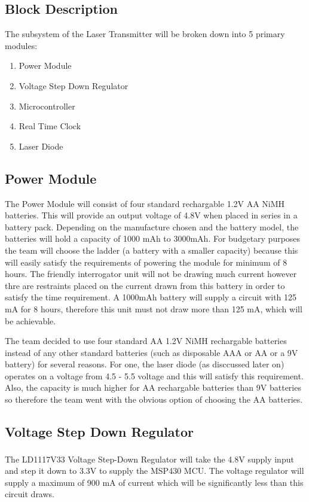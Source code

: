 \documentclass[letterpaper,10pt]{article}
\begin{document}
\begin{spacing}{1.15}
\section{Block Description}
The subsystem of the Laser Transmitter will be broken down into 5 primary modules:
\begin{enumerate}
	\item Power Module
	\item Voltage Step Down Regulator
	\item Microcontroller 
	\item Real Time Clock
	\item Laser Diode
\end{enumerate}

\subsection*{Power Module}
The Power Module will consist of four standard rechargable 1.2V AA NiMH batteries. This will provide an output voltage of 4.8V when placed in series in a battery pack. Depending on the manufacture chosen and the battery model, the batteries will hold a capacity of 1000 mAh to 3000mAh. For budgetary purposes the team will choose the ladder (a battery with a smaller capacity) because this will easily satisfy the requirements of powering the module for minimum of 8 hours. The friendly interrogator unit will not be drawing much current however thre are restraints placed on the current drawn from this battery in order to satisfy the time requirement. A 1000mAh battery will supply a circuit with 125 mA for 8 hours, therefore this unit must not draw more than 125 mA, which will be achievable.

The team decided to use four standard AA 1.2V NiMH rechargable batteries instead of any other standard batteries (such as disposable AAA or AA or a 9V battery) for several reasons. For one, the laser diode (as disccussed later on) operates on a voltage from 4.5 - 5.5 voltage and this will satisfy this requirement. Also, the capacity is much higher for AA rechargable batteries than 9V batteries so therefore the team went with the obvious option of choosing the AA batteries.  

\subsection*{Voltage Step Down Regulator}
The LD1117V33 Voltage Step-Down Regulator\textsuperscript{\cite{LD1117-Voltage-Regulator}} will take the 4.8V supply input and step it down to 3.3V to supply the MSP430 MCU. The voltage regulator will supply a maximum of 900 mA of current which will be significantly less than this circuit draws.


\end{spacing}
\end{document}
